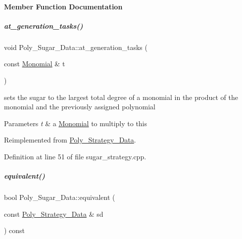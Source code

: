 \paragraph{Member Function Documentation}
\mbox{\label{group__strategygroup_aa80c660f10b1c5d0dd2a305d598685f5}} 
\subparagraph{\texorpdfstring{at\+\_\+generation\+\_\+tasks()}{at\_generation\_tasks()}}
{\footnotesize\ttfamily void Poly\+\_\+\+Sugar\+\_\+\+Data\+::at\+\_\+generation\+\_\+tasks (\begin{DoxyParamCaption}\item[{const \hyperlink{group__polygroup_class_monomial}{Monomial} \&}]{t }\end{DoxyParamCaption})\hspace{0.3cm}{\ttfamily [virtual]}}



sets the sugar to the largest total degree of a monomial in the product of the monomial and the previously assigned polynomial 


\begin{DoxyParams}{Parameters}
{\em t} & a \hyperlink{group__polygroup_class_monomial}{Monomial} to multiply to {\ttfamily this} \\
\hline
\end{DoxyParams}


Reimplemented from \hyperlink{group__strategygroup_a6683749a5fb30b6f91075a28899fbfe7}{Poly\+\_\+\+Strategy\+\_\+\+Data}.



Definition at line 51 of file sugar\+\_\+strategy.\+cpp.

\mbox{\label{group__strategygroup_a73df53a8da9e4cfaf66202a1451d5b2e}} 
\subparagraph{\texorpdfstring{equivalent()}{equivalent()}}
{\footnotesize\ttfamily bool Poly\+\_\+\+Sugar\+\_\+\+Data\+::equivalent (\begin{DoxyParamCaption}\item[{const \hyperlink{group__strategygroup_class_poly___strategy___data}{Poly\+\_\+\+Strategy\+\_\+\+Data} \&}]{sd }\end{DoxyParamCaption}) const\hspace{0.3cm}{\ttfamily [virtual]}}



